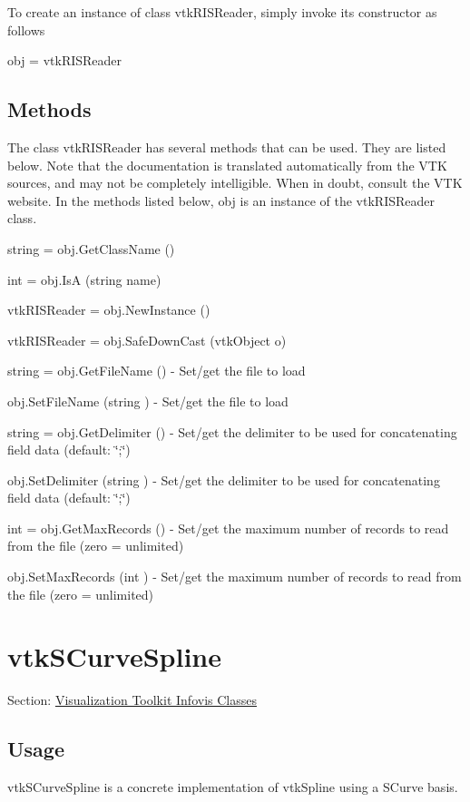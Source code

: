 To create an instance of class vtk\-R\-I\-S\-Reader, simply invoke its constructor as follows \begin{DoxyVerb}  obj = vtkRISReader
\end{DoxyVerb}
 \hypertarget{vtkwidgets_vtkxyplotwidget_Methods}{}\subsection{Methods}\label{vtkwidgets_vtkxyplotwidget_Methods}
The class vtk\-R\-I\-S\-Reader has several methods that can be used. They are listed below. Note that the documentation is translated automatically from the V\-T\-K sources, and may not be completely intelligible. When in doubt, consult the V\-T\-K website. In the methods listed below, {\ttfamily obj} is an instance of the vtk\-R\-I\-S\-Reader class. 
\begin{DoxyItemize}
\item {\ttfamily string = obj.\-Get\-Class\-Name ()}  
\item {\ttfamily int = obj.\-Is\-A (string name)}  
\item {\ttfamily vtk\-R\-I\-S\-Reader = obj.\-New\-Instance ()}  
\item {\ttfamily vtk\-R\-I\-S\-Reader = obj.\-Safe\-Down\-Cast (vtk\-Object o)}  
\item {\ttfamily string = obj.\-Get\-File\-Name ()} -\/ Set/get the file to load  
\item {\ttfamily obj.\-Set\-File\-Name (string )} -\/ Set/get the file to load  
\item {\ttfamily string = obj.\-Get\-Delimiter ()} -\/ Set/get the delimiter to be used for concatenating field data (default\-: \char`\"{};\char`\"{})  
\item {\ttfamily obj.\-Set\-Delimiter (string )} -\/ Set/get the delimiter to be used for concatenating field data (default\-: \char`\"{};\char`\"{})  
\item {\ttfamily int = obj.\-Get\-Max\-Records ()} -\/ Set/get the maximum number of records to read from the file (zero = unlimited)  
\item {\ttfamily obj.\-Set\-Max\-Records (int )} -\/ Set/get the maximum number of records to read from the file (zero = unlimited)  
\end{DoxyItemize}\hypertarget{vtkinfovis_vtkscurvespline}{}\section{vtk\-S\-Curve\-Spline}\label{vtkinfovis_vtkscurvespline}
Section\-: \hyperlink{sec_vtkinfovis}{Visualization Toolkit Infovis Classes} \hypertarget{vtkwidgets_vtkxyplotwidget_Usage}{}\subsection{Usage}\label{vtkwidgets_vtkxyplotwidget_Usage}
vtk\-S\-Curve\-Spline is a concrete implementation of vtk\-Spline using a S\-Curve basis.


